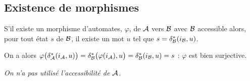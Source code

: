\subsection{Existence de morphismes}
\begin{Exercise}
S'il existe un morphisme d'automates, $\varphi$, de ${\cal A}$ vers ${\cal B}$ avec ${\cal B}$ accessible alors, pour tout état $s$ de ${\cal B}$, il existe un mot $u$ tel que $s = \delta_{\cal B}^*(i_{\cal B}, u)$. 

On a alors $\varphi\bigl(\delta_{\cal A}^*(i_{\cal A}, u)\bigr) = \delta_{\cal B}^*\bigl(\varphi(i_{\cal A}), u\bigr) 
=\delta_{\cal B}^*(i_{\cal B}, u) = s$ : $\varphi$ est bien surjective.

\smallskip
{\it On n'a pas utilisé l'accessibilité de ${\cal A}$.}
\end{Exercise}
